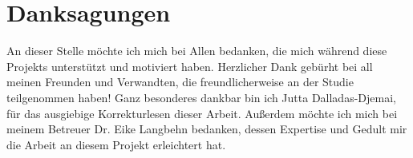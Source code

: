 \chapter*{Danksagungen}\label{chapter:acknowledgements}
    An dieser Stelle möchte ich mich bei Allen bedanken, die mich während diese Projekts unterstützt und motiviert haben.
    Herzlicher Dank gebürht bei all meinen Freunden und Verwandten, die freundlicherweise an der Studie teilgenommen haben!
    Ganz besonderes dankbar bin ich Jutta Dalladas-Djemai, für das ausgiebige Korrekturlesen dieser Arbeit.
    Außerdem möchte ich mich bei meinem Betreuer Dr. Eike Langbehn bedanken, dessen Expertise und Gedult mir die Arbeit an diesem Projekt erleichtert hat.

